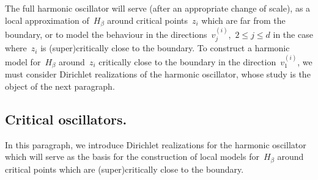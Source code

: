 \documentclass[10pt]{article}
\newcommand{\1}{\mathbbm 1}
\newcommand{\hessEigvec}[2]{v^{(#1)}_{#2}} %
\begin{document}
    The full harmonic oscillator will serve (after an appropriate change of scale), as a local approximation of~$H_\beta$ around critical points~$z_i$ which are far from the boundary, or to model the behaviour in the directions~$\hessEigvec{i}{j}$,~$2\leq j \leq d$ in the case where~$z_i$ is (super)critically close to the boundary.
    To construct a harmonic model for~$H_\beta$ around~$z_i$ critically close to the boundary in the direction~$\hessEigvec{i}{1}$, we must consider Dirichlet realizations of the harmonic oscillator, whose study is the object of the next paragraph.
    \subsection{Critical oscillators.}\label{subsec:critical_oscillators}
    In this paragraph, we introduce Dirichlet realizations for the harmonic oscillator which will serve as the basis for the construction of local models for~$H_\beta$ around critical points which are (super)critically close to the boundary.
\end{document}
